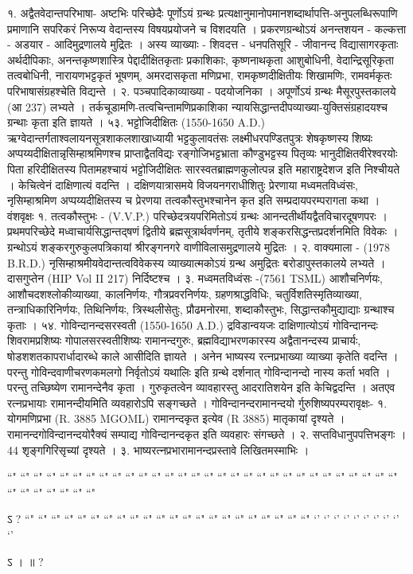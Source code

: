 १. अद्वैतवेदान्तपरिभाषा-
अष्टभिः परिच्छेदैः पूर्णोऽयं ग्रन्थः प्रत्यक्षानुमानोपमानशब्दार्थापत्ति-अनुपलब्धिरूपाणि प्रमाणानि सपरिकरं निरूप्य वेदान्तस्य विषयप्रयोजने च विशदयति । प्रकरणग्रन्थोऽयं अनन्तशयन - कल्कत्ता - अडयार - आदिमुद्रणालये मुद्रितः । अस्य व्याख्याः - शिवदत्त - धनपतिसूरि - जीवानन्द विद्यासागरकृताः अर्थदीपिकाः, अनन्तकृष्णशास्त्रि पेद्दादीक्षितकृताः प्रकाशिकाः, कृष्णनाथकृता आशुबोधिनी, वेदान्द्रिसूरिकृता तत्वबोधिनी, नारायणभट्टकृतं भूषणम्, अमरदासकृता मणिप्रभा, रामकृष्णदीक्षितीयः शिखामणिः, रामवर्मकृतः परिभाषासंग्रहश्चेति विद्यन्ते ।
२. पञ्चपादिकाव्याख्या - पदयोजनिका । अपूर्णोऽयं ग्रन्थः मैसूरपुस्तकालये (आ 237) लभ्यते ।
तर्कचूडामणि-तत्वचिन्तामणिप्रकाशिका न्यायसिद्धान्तदीपव्याख्या-युक्तिसंग्रहादयश्च ग्रन्थाः कृता इति ज्ञायते ।
५३. भट्टोजिदीक्षितः (1550-1650 A.D.)
ऋग्वेदान्तर्गताश्वलायनसूत्रशाकलशाखाध्यायी भट्टकुलावतंसः लक्ष्मीधरपण्डितपुत्रः शेषकृष्णस्य शिष्यः अप्पय्यदीक्षितान्नृसिम्हाश्रमिणश्च प्राप्ताद्वैतविद्यः रङ्गोजिभट्टभ्राता कौण्डुभट्टस्य पितृव्यः भानुदीक्षितवीरेश्वरयोः पिता हरिदीक्षितस्य पितामहश्चायं भट्टोजिदीक्षितः सारस्वतब्राह्मणकुलोत्पन्न इति महाराष्ट्रदेशज इति निश्चीयते । केचित्वेनं दाक्षिणात्यं वदन्ति । दक्षिणयात्रासमये विजयनगराधीशितुः प्रेरणाया मध्वमतविध्वंसः, नृसिम्हाश्रमिण अप्पय्यदीक्षितस्य च प्रेरणया तत्वकौस्तुभश्चानेन कृत इति सम्प्रदायपरम्परागता कथा ।
वंशवृक्षः
१. तत्वकौस्तुभः - (V.V.P.)
परिच्छेदत्रयपरिमितोऽयं ग्रन्थः आनन्दतीर्थीयद्वैतविचारदूषणपरः । प्रथमपरिच्छेदे मध्वाचार्यसिद्धान्तद्षणं द्वितीये ब्रह्मसूत्रार्थवर्णनम्, तृतीये शङ्करसिद्धन्तप्रदर्शनमिति विवेकः । ग्रन्थोऽयं शङ्करगुरुकुलपत्रिकायां श्रीरङ्गनगरे वाणीविलासमुद्रणालये मुद्रितः ।
२. वाक्यमाला - (1978 B.R.D.)
नृसिम्हाश्रमीयवेदान्तत्वविवेकस्य व्याख्यात्मकोऽयं ग्रन्थ अमुद्रितः बरोडापुस्तकालये लभ्यते । दासगुप्तेन (HIP Vol II 217) निर्दिष्टश्च ।
३. मध्वमतविध्वंसः -(7561 TSML)
आशौचनिर्णयः, आशौचदशश्लोकीव्याख्या, कालनिर्णयः, गौत्रप्रवरनिर्णयः, ग्रहणश्राद्धविधिः, चतुर्विशतिस्मृतिव्याख्या, तन्त्राधिकारिनिर्णयः, तिथिनिर्णयः, त्रिस्थलीसेतुः, प्रौढमनोरमा, शब्दाकौस्तुभः, सिद्धान्तकौमुद्याद्याः ग्रन्थाश्च कृताः ।
५४. गोविन्दानन्दसरस्वती (1550-1650 A.D.)
द्रविडान्वयजः दाक्षिणात्योऽयं गोविन्दानन्दः शिवरामप्रशिष्यः गोपालसरस्वतीशिष्यः रामानन्दगुरुः, ब्रह्मविद्याभरणकारस्य अद्वैतानन्दस्य प्राचार्यः, षोडशशतकापरार्धादारब्धे काले आसीदिति ज्ञायते । अनेन भाष्यस्य रत्नप्रभाख्या व्याख्या कृतेति वदन्ति । परन्तु गोविन्दवाणीचरणकमलगो निर्वृतोऽयं यथालिः इति ग्रन्थे दर्शनात् गोविन्दानन्दो नास्य कर्ता भवति । परन्तु तच्छिष्येण रामानन्देनैव कृता । गुरुकृतत्वेन व्यावहारस्तु आदरातिशयेन इति केचिद्वदन्ति । अतएव रत्नप्रभायाः रामानन्दीयमिति व्यवहारोऽपि सङ्गच्छते । गोविन्दानन्दरामानन्दयो र्गुरुशिष्यपरम्परावृक्षः-
१. योगमणिप्रभा (R. 3885 MGOML) रामानन्दकृत इत्येव (R 3885) मातृकायां दृश्यते । रामानन्दगोविन्दानन्दयोरैक्यं सम्पाद्य गोविन्दानन्दकृत इति व्यवहारः संगच्छते ।
२. सप्तविधानुपपत्तिभङ्गः । 44 शृङ्गगिरिसृच्यां दृश्यते । ३. भाष्यरत्नप्रभारामानन्दप्रस्तावे लिखितमस्माभिः । 

 ``" ``" ``" ``" ``" ``" ``" ``" ``" ``" ``" ``" ``" ``" ``" ``" ``" ``" ``" ``" ``" ``" ``" ``" ``" ``" ``" ``" ``" ``" ``" ``" ``" ``" ``" ``" ``"

ऽ  ?
``" ``" ``" ``" ``" ``" ``" ``" ``" ``" ``" ``" ``" ``" ``" ``" ``" ``" ``" ``" ``" ``"
`' `' `' `' `' `' `' `' `' `' 

ऽ  ।   ॥ ?
